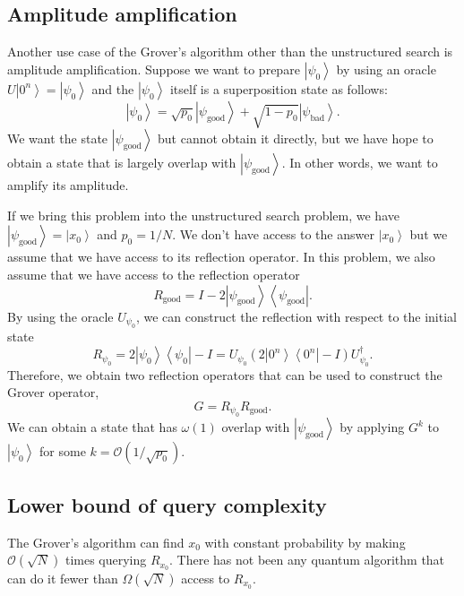 \documentclass[11pt]{article}
\newcommand{\bra}[1]{\left\langle #1\right|}
\newcommand{\ket}[1]{\left|#1\right\rangle}
\begin{document}
\subsection{Amplitude amplification}
Another use case of the Grover's algorithm other than the unstructured search is amplitude amplification. Suppose we want to prepare $\ket{\psi_0}$ by using an oracle $U\ket{0^n} = \ket{\psi_0}$ and the $\ket{\psi_0}$ itself is a superposition state as follows:
\begin{equation}
    \ket{\psi_0} = \sqrt{p_0}\ket{\psi_{\text{good}}} + \sqrt{1-p_0}\ket{\psi_{\text{bad}}}.
\end{equation}
We want the state $\ket{\psi_{\text{good}}}$ but cannot obtain it directly, but we have hope to obtain a state that is largely overlap with $\ket{\psi_{\text{good}}}$. In other words, we want to amplify its amplitude. 

If we bring this problem into the unstructured search problem, we have $\ket{\psi_{\text{good}}} = \ket{x_0}$ and $p_0 = 1/N$. We don't have access to the answer $\ket{x_0}$ but we assume that we have access to its reflection operator. In this problem, we also assume that we have access to the reflection operator 
\begin{equation}
    R_{\text{good}} = I - 2\ket{\psi_{\text{good}}}\bra{\psi_{\text{good}}}.
\end{equation}
By using the oracle $U_{\psi_0}$, we can construct the reflection with respect to the initial state 
\begin{equation}
    R_{\psi_0} = 2\ket{\psi_0}\bra{\psi_0} - I = U_{\psi_0}(2\ket{0^n}\bra{0^n} - I)U_{\psi_0}^\dagger.
\end{equation}
Therefore, we obtain two reflection operators that can be used to construct the Grover operator, 
\begin{equation}
    G = R_{\psi_0}R_{\text{good}}.
\end{equation}
We can obtain a state that has $\omega(1)$ overlap with $\ket{\psi_{\text{good}}}$ by applying $G^k$ to $\ket{\psi_0}$ for some $k = \mathcal{O}(1/\sqrt{p_0})$.

\subsection{Lower bound of query complexity}
The Grover's algorithm can find $x_0$ with constant probability by making $\mathcal{O}(\sqrt{N})$ times querying $R_{x_0}$. There has not been any quantum algorithm that can do it fewer than $\Omega(\sqrt{N})$ access to $R_{x_0}$.
\end{document}
